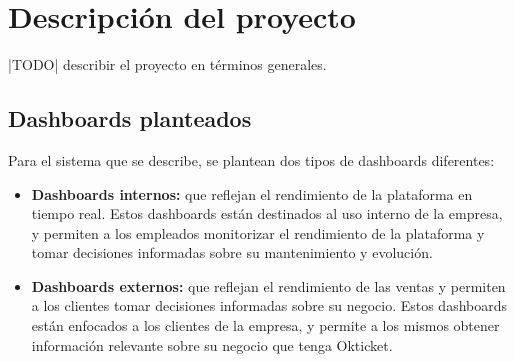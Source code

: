 \section{Descripción del proyecto}\label{sec:descripcion}
%

|TODO| describir el proyecto en términos generales.

\subsection{Dashboards planteados}
Para el sistema que se describe, se plantean dos tipos de dashboards diferentes:

\begin{itemize}
	\item \textbf{Dashboards internos:} que reflejan el rendimiento de la
		plataforma en tiempo real. Estos dashboards están destinados al uso
		interno de la empresa, y permiten a los empleados monitorizar el
		rendimiento de la plataforma y tomar decisiones informadas sobre su
		mantenimiento y evolución.
	\item \textbf{Dashboards externos:} que reflejan el rendimiento de las
		ventas y permiten a los clientes tomar decisiones informadas sobre su
		negocio. Estos dashboards están enfocados a los clientes de la empresa,
		y permite a los mismos obtener información relevante sobre su negocio
		que tenga Okticket.
\end{itemize}
